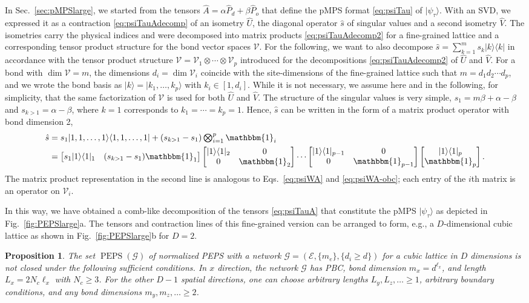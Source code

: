 \documentclass[english,11pt,aps,pra,onecolumn,tightenlines,groupedaddress,superscriptaddress,notitlepage,floatfix,fleqn]{revtex4-1}
\newcommand{\id}{\mathbbm{1}}
\newcommand{\bra}{\langle}
\newcommand{\ket}{\rangle}
\newcommand{\hA}{\hat{A}}
\newcommand{\hP}{\hat{P}}
\newcommand{\hU}{\hat{U}}
\newcommand{\hV}{\hat{V}}
\newcommand{\mc}[1]{\mathcal{#1}}
\newcommand{\V}{\mc{V}}
\newcommand{\E}{\mc{E}}
\newcommand{\G}{\mc{G}}
\newcommand{\PEPS}{\operatorname{PEPS}}
\renewcommand{\Bmatrix}[1]{\begin{bmatrix}#1\end{bmatrix}}
\newtheorem{prop}{Proposition}
\begin{document}
In Sec.~\ref{sec:pMPSlarge}, we started from the tensors $\hA=\alpha \hP_d+\beta\hP_o$ that define the pMPS format \eqref{eq:psiTau} of $|\psi_\tau\ket$. With an SVD, we expressed it as a contraction \eqref{eq:psiTauAdecomp} of an isometry $\hU$, the diagonal operator $\hat{s}$ of singular values and a second isometry $\hV$. The isometries carry the physical indices and were decomposed into matrix products \eqref{eq:psiTauAdecomp2} for a fine-grained lattice and a corresponding tensor product structure for the bond vector spaces $\V$. For the following, we want to also decompose $\hat{s}=\sum_{k=1}^m s_k|k\ket\bra k|$ in accordance with the tensor product structure $\V=\V_1\otimes\dotsb\otimes \V_p$ introduced for the decompositions \eqref{eq:psiTauAdecomp2} of $\hU$ and $\hV$. For a bond with $\dim\V=m$, the dimensions $d_i=\dim \V_i$ coincide with the site-dimensions of the fine-grained lattice such that $m=d_1d_2\dotsb d_p$, and we wrote the bond basis as $|k\ket=|k_1,\dotsc,k_p\ket$ with $k_i\in[1,d_i]$. While it is not necessary, we assume here and in the following, for simplicity, that the same factorization of $\V$ is used for both $\hU$ and $\hV$.
The structure of the singular values is very simple, $s_1=m\beta+\alpha-\beta$ and $s_{k>1}=\alpha-\beta$, where $k=1$ corresponds to $k_1=\dotsb =k_p=1$. Hence, $\hat{s}$ can be written in the form of a matrix product operator \cite{Schollwoeck2011-326} with bond dimension 2,
\begin{subequations}\label{eq:psiTau-s-decomp}
\begin{align}
	\hat{s}&\textstyle=s_1|1,1,\dotsc,1\ket\bra 1,1,\dotsc,1|+(s_{k>1}-s_1)\bigotimes_{i=1}^p\id_i\\
	&=\Bmatrix{s_1|1\ket\bra 1|_1 & (s_{k>1}-s_1)\id_1}
	\Bmatrix{|1\ket\bra 1|_2 &0\\ 0& \id_2} \dotsb
	\Bmatrix{|1\ket\bra 1|_{p-1} &0\\ 0& \id_{p-1}}
	\Bmatrix{|1\ket\bra 1|_p \\ \id_p}.
\end{align}
\end{subequations}
The matrix product representation in the second line is analogous to Eqs.~\eqref{eq:psiWA} and \eqref{eq:psiWA-obc}; each entry of the $i$th matrix is an operator on $\V_i$.

In this way, we have obtained a comb-like decomposition of the tensors \eqref{eq:psiTauA} that constitute the pMPS $|\psi_\tau\ket$ as depicted in Fig.~\ref{fig:PEPSlarge}a. The tensors and contraction lines of this fine-grained version can be arranged to form, e.g., a $D$-dimensional cubic lattice as shown in Fig.~\ref{fig:PEPSlarge}b for $D=2$.
\begin{prop}\label{prop:PEPSbig1}
The set $\PEPS(\G)$ of normalized PEPS with a network $\G=(\E,\{m_e\},\{d_i\geq d\})$ for a cubic lattice in $D$ dimensions is not closed under the following sufficient conditions.
In $x$ direction, the network $\G$ has PBC, bond dimension $m_x=d^{\ell_x}$, and length $L_x= 2N_c\ell_x$ with $N_c\geq 3$. For the other $D-1$ spatial directions,
one can choose arbitrary lengths $L_y,L_z,\dotsc\geq 1$, arbitrary boundary conditions, and any bond dimensions $m_y,m_z,\dotsc\geq 2$. 
\end{prop}
\end{document}
